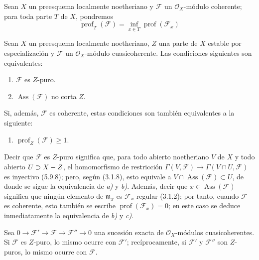 \begin{env}[5.10.1]
\label{IV.2.s5.10.1-fr}
Sean $X$ un preesquema localmente noetheriano y $\mathcal F$ un
$\mathcal O_X$-módulo coherente; para toda parte $T$ de $X$, pondremos
\begin{equation}
\operatorname{prof}_T(\mathcal F)
=\inf_{x\in T}\operatorname{prof}(\mathcal F_x)
\tag{5.10.1.1}\label{IV.2.s5.10.1.1-fr}
\end{equation}
\end{env}

\begin{proposition}[5.10.2]
Sean $X$ un preesquema localmente noetheriano, $Z$ una parte de $X$ estable
por especialización y $\mathcal F$ un $\mathcal O_X$-módulo cuasicoherente.
Las condiciones siguientes son equivalentes:
\begin{enumerate}
\item[\textup{a)}] $\mathcal F$ es $Z$-puro.
\item[\textup{b)}] $\operatorname{Ass}(\mathcal F)$ no corta $Z$.
\end{enumerate}
Si, además, $\mathcal F$ es coherente, estas condiciones son también
equivalentes a la siguiente:
\begin{enumerate}
\item[\textup{c)}] $\operatorname{prof}_Z(\mathcal F)\geq1$.
\end{enumerate}
\end{proposition}

Decir que $\mathcal F$ es $Z$-puro significa que, para todo abierto
noetheriano $V$ de $X$ y todo abierto $U\supset X- Z$, el homomorfismo de
restricción
$\Gamma(V,\mathcal F)\longrightarrow\Gamma(V\cap U,\mathcal F)$
es inyectivo (5.9.8); pero, según (3.1.8), esto equivale a
$V\cap\operatorname{Ass}(\mathcal F)\subset U$, de donde se sigue la
equivalencia de \emph{a)} y \emph{b)}. Además, decir que
$x\in\operatorname{Ass}(\mathcal F)$ significa que ningún elemento de
$\mathfrak m_x$ es $\mathcal F_x$-regular (3.1.2); por tanto, cuando
$\mathcal F$ es coherente, esto también se escribe
$\operatorname{prof}(\mathcal F_x)=0$; en este caso se deduce inmediatamente
la equivalencia de \emph{b)} y \emph{c)}.

\begin{corollary}[5.10.3]
\label{IV.2.s5.10.3-fr}
Sea
$0\longrightarrow\mathcal F'\longrightarrow\mathcal F
\longrightarrow\mathcal F''\longrightarrow0$
una sucesión exacta de $\mathcal O_X$-módulos cuasicoherentes. Si
$\mathcal F$ es $Z$-puro, lo mismo ocurre con $\mathcal F'$; recíprocamente,
si $\mathcal F'$ y $\mathcal F''$ son $Z$-puros, lo mismo ocurre con
$\mathcal F$.
\end{corollary}

